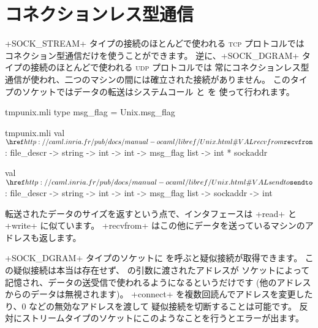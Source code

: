 \section{\label{sec/mode-deconnecte}コネクションレス型通信}

\ml+SOCK_STREAM+ タイプの接続のほとんどで使われる \textsc{tcp} プロトコルでは
コネクション型通信だけを使うことができます。
逆に、\ml+SOCK_DGRAM+ タイプの接続のほとんどで使われる \textsc{udp} プロトコルでは
常にコネクションレス型通信が使われ、二つのマシンの間には確立された接続がありません。
このタイプのソケットではデータの転送はシステムコール  と  を
使って行われます。
%
\begin{codefile}{tmpunix.mli}
type msg_flag = Unix.msg_flag
\end{codefile}
%
\begin{listingcodefile}{tmpunix.mli}
val $\libvalue{Unix}{recvfrom}$ :
  file_descr -> string -> int -> int -> msg_flag list -> int * sockaddr

val $\libvalue{Unix}{sendto}$ :
  file_descr -> string -> int -> int -> msg_flag list -> sockaddr -> int
\end{listingcodefile}
%
転送されたデータのサイズを返すという点で、インタフェースは \ml+read+ と \ml+write+ に似ています。
\ml+recvfrom+ はこの他にデータを送っているマシンのアドレスも返します。

\ml+SOCK_DGRAM+ タイプのソケットに  を呼ぶと疑似接続が取得できます。
この疑似接続は本当は存在せず、  の引数に渡されたアドレスが
ソケットによって記憶され、データの送受信で使われるようになるというだけです (他のアドレスからのデータは無視されます)。
\ml+connect+ を複数回読んでアドレスを変更したり、0 などの無効なアドレスを渡して
疑似接続を切断することは可能です。
反対にストリームタイプのソケットにこのようなことを行うとエラーが出ます。

